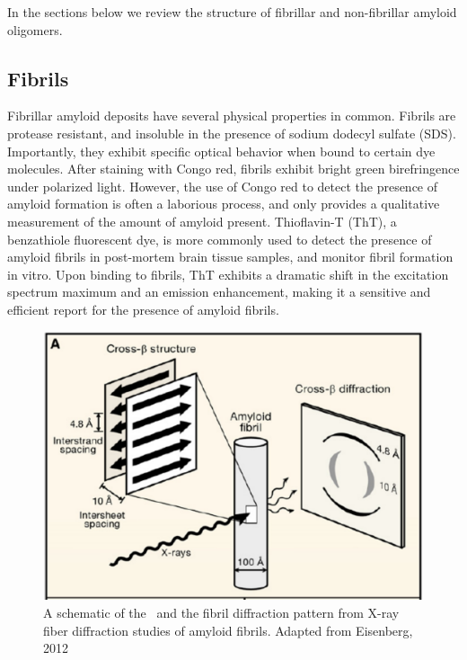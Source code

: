 In the sections below we review the structure of fibrillar and non-fibrillar amyloid oligomers. 


\subsection{Fibrils}

Fibrillar amyloid deposits have several physical properties in common. Fibrils are protease resistant, and insoluble in the presence of sodium dodecyl sulfate (SDS).\cite{Eisenberg:2012hm} Importantly, they exhibit specific optical behavior when bound to certain dye molecules. After staining with Congo red, fibrils exhibit bright green birefringence under polarized light. However, the use of Congo red to detect the presence of amyloid formation is often a laborious process, and only provides a qualitative measurement of the amount of amyloid present. Thioflavin-T (ThT), a benzathiole fluorescent dye, is more commonly used to detect the presence of amyloid fibrils in post-mortem brain tissue samples, and monitor fibril formation in vitro. Upon binding to fibrils, ThT exhibits a dramatic shift in the excitation spectrum maximum and an emission enhancement, making it a sensitive and efficient report for the presence of amyloid fibrils.

\begin{figure}
 \centering
 \includegraphics[width=6in]{figures/introduction/fibril_structure_diffraction.pdf}
 \caption[Characteristic cross-$\beta$ spacings from X-ray fibre diffraction studies of amyloid fibrils]{A schematic of the \crossbs\ and the fibril diffraction pattern from X-ray fiber diffraction studies of amyloid fibrils. Adapted from Eisenberg, 2012}
 \label{fig:fibril_diffraction}
\end{figure}


